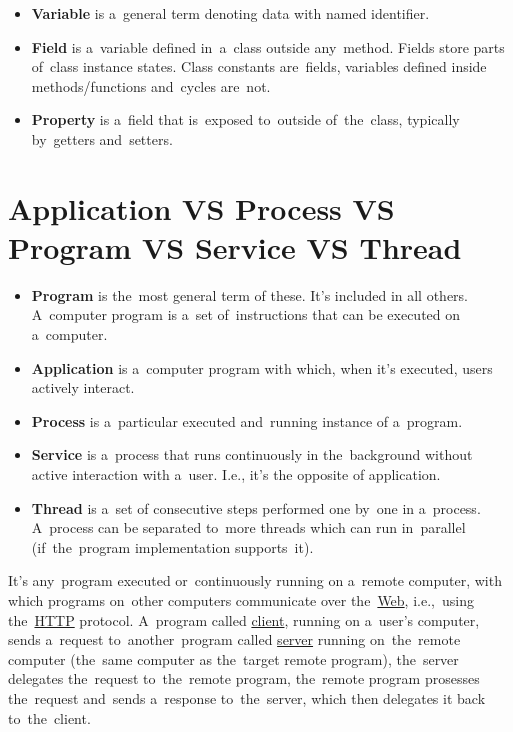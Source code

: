 
\label{variablefieldproperty}
\begin{itemize}
    \item \textbf{Variable} is a~general term denoting data with named identifier.
    \item \textbf{Field} is a~variable defined in~a~class outside any~method. Fields store parts of~class instance states. Class constants are~fields, variables defined inside \mbox{methods/functions} and~cycles are~not.
    \item \textbf{Property} is a~field that is~exposed to~outside of~the~class, typically by~getters and~setters.
\end{itemize}

\section*{\fontsize{17}{17} \selectfont Application VS Process VS Program VS Service VS Thread}
\label{applicationprocessprogramservicethread}
\begin{itemize}
    \item \textbf{Program} is the~most general term of these. It's included in all others. A~computer program is a~set of~instructions that can be executed on a~computer.
    \item \textbf{Application} is a~computer program with which, when it's executed, users actively interact.
    \item \textbf{Process} is a~particular executed and~running instance of a~program.
    \item \textbf{Service} is a~process that runs continuously in the~background without active interaction with a~user. I.e., it's the opposite of application.
    \item \textbf{Thread} is a~set of consecutive steps performed one by~one in a~process. A~process can be separated to~more threads which can run in~parallel (if~the~program implementation supports~it).
\end{itemize}

\label{webservice}
It's any~program executed or~continuously running on a~remote computer, with which programs on~other computers communicate over the~\hyperref[internetweb]{Web}, i.e.,~using the~\hyperref[http]{HTTP} protocol. A~program called \hyperref[clientserverarchitecture]{client}, running on a~user's computer, sends a~request to~another~program called \hyperref[clientserverarchitecture]{server} running on~the~remote computer (the~same computer as the~target remote program), the~server delegates the~request to~the~remote program, the~remote program prosesses the~request and~sends a~response to~the~server, which then delegates it back to~the~client.

